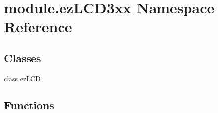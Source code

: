 \hypertarget{namespacemodule_1_1ez_l_c_d3xx}{\section{module.\-ez\-L\-C\-D3xx Namespace Reference}
\label{d2/d2f/namespacemodule_1_1ez_l_c_d3xx}
}
\subsection*{Classes}
\begin{DoxyCompactItemize}
\item 
class \hyperlink{classmodule_1_1ez_l_c_d3xx_1_1ez_l_c_d}{ez\-L\-C\-D}
\end{DoxyCompactItemize}
\subsection*{Functions}
